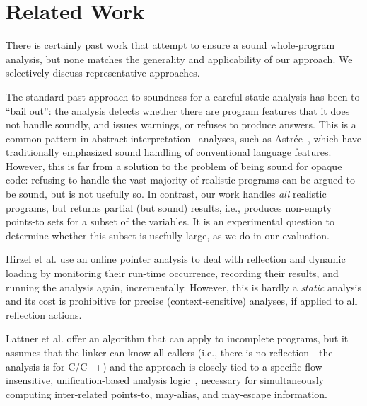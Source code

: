 
\section{Related Work}
\label{sec:related}


There is certainly past work that attempt to ensure a sound
whole-program analysis, but none matches the generality and
applicability of our approach. We selectively discuss representative
approaches.

The standard past approach to soundness for a careful static analysis
has been to ``bail out'': the analysis detects whether there are
program features that it does not handle soundly, and issues warnings,
or refuses to produce answers. This is a common pattern in
abstract-interpretation~\cite{popl:1977:Cousot} analyses,
such as Astr\'{e}e~\cite{sas:2007:Delmas}, which have traditionally
emphasized sound handling of conventional language features. However,
this is far from a solution to the problem of being sound for opaque
code: refusing to handle the vast majority of realistic programs can
be argued to be sound, but is not usefully so. In contrast, our work
handles \emph{all} realistic programs, but returns partial (but sound)
results, i.e., produces non-empty points-to sets for a subset of the
variables. It is an experimental question to determine whether
this subset is usefully large, as we do in our evaluation.

Hirzel et al. \cite{ecoop:2004:Hirzel,article:2007:Hirzel} use an
online pointer analysis to deal with reflection and dynamic loading by
monitoring their run-time occurrence, recording their results, and
running the analysis again, incrementally. However, this is hardly a
\emph{static} analysis and its cost is prohibitive for precise
(context-sensitive) analyses, if applied to all reflection
actions. 

Lattner et al. \cite{pldi:2007:Lattner} offer an algorithm that can apply to incomplete
programs, but it assumes that the linker can know all callers (i.e.,
there is no reflection---the analysis is for C/C++) and the approach
is closely tied to a specific flow-insensitive, unification-based
analysis logic~\cite{popl:1996:Steensgaard}, necessary
for simultaneously computing inter-related points-to, may-alias, and
may-escape information.

